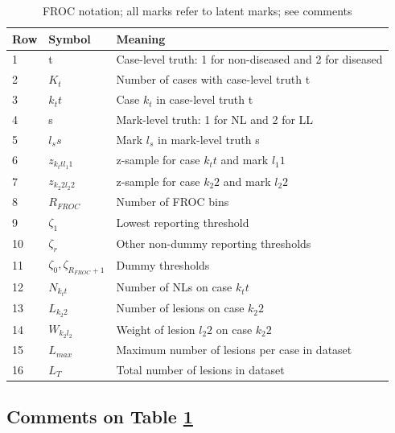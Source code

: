 \documentclass[
]{book}
\begin{document}
\begin{table}

\caption{\label{tab:froc-empirical-notation}FROC notation; all marks refer to latent marks; see comments}
\centering
\begin{tabular}[t]{l|l|l}
\hline
Row & Symbol & Meaning\\
\hline
1 & t & Case-level truth: 1 for non-diseased and 2 for diseased\\
\hline
2 & $K_t$ & Number of cases with case-level truth t\\
\hline
3 & $k_t t$ & Case $k_t$ in case-level truth t\\
\hline
4 & s & Mark-level truth: 1 for NL and 2 for LL\\
\hline
5 & $l_s s$ & Mark $l_s$ in mark-level truth s\\
\hline
6 & $z_{k_t t l_1 1}$ & z-sample for case $k_t t$ and mark $l_1 1$\\
\hline
7 & $z_{k_2 2 l_2 2}$ & z-sample for case $k_2 2$ and mark $l_2 2$\\
\hline
8 & $R_{FROC}$ & Number of FROC bins\\
\hline
9 & $\zeta_1$ & Lowest reporting threshold\\
\hline
10 & $\zeta_r$ & Other non-dummy reporting thresholds\\
\hline
11 & $\zeta_0, \zeta_{R_{FROC}+1}$ & Dummy thresholds\\
\hline
12 & $N_{k_t t}$ & Number of NLs on case $k_t t$\\
\hline
13 & $L_{k_2 2}$ & Number of lesions on case $k_2 2$\\
\hline
14 & $W_{k_2 l_2}$ & Weight of lesion $l_2 2$ on case $k_2 2$\\
\hline
15 & $L_{max}$ & Maximum number of lesions per case in dataset\\
\hline
16 & $L_T$ & Total number of lesions in dataset\\
\hline
\end{tabular}
\end{table}

\hypertarget{comments-on-table-reftabfroc-empirical-notation}{%
\subsection{Comments on Table \ref{tab:froc-empirical-notation}}\label{comments-on-table-reftabfroc-empirical-notation}}
\end{document}
